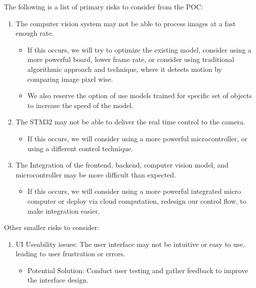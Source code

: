 \documentclass{article}
\begin{document}
The following is a list of primary risks to consider from the POC:
\begin{enumerate}
  \item The computer vision system may not be able to process images at a fast enough
        rate.
        \begin{itemize}
          \item If this occurs, we will try to optimize the existing model, consider using a
                more powerful board, lower frame rate, or consider using traditional
                algorithmic approach and technique, where it detects motion by comparing image
                pixel wise.
          \item We also reserve the option of use models trained for specific set of objects to
                increase the speed of the model.
        \end{itemize}
  \item The STM32 may not be able to deliver the real time control to the camera.
        \begin{itemize}
          \item If this occurs, we will consider using a more powerful microcontroller, or
                using a different control technique.
        \end{itemize}
  \item The Integration of the frontend, backend, computer vision model, and
        microcontroller may be more difficult than expected.
        \begin{itemize}
          \item If this occurs, we will consider using a more powerful integrated micro
                computer or deploy via cloud computation, redesign our control flow, to make
                integration easier.
        \end{itemize}
\end{enumerate}

Other smaller risks to consider:
\begin{enumerate}
  \item UI Useability issues: The user interface may not be intuitive or easy to use,
        leading to user frustration or errors.
        \begin{itemize}
          \item {Potential Solution}: Conduct user testing and gather feedback to improve the interface design.
        \end{itemize}
\end{enumerate}
\end{document}
